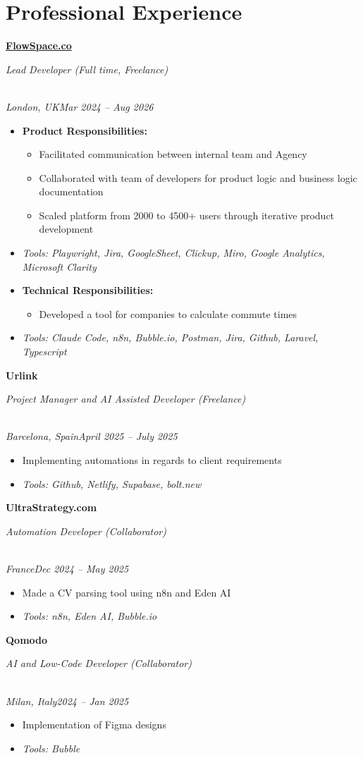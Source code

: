 \documentclass[a4paper,10pt]{article}
\newcommand{\role}[4]{\vspace{3pt}\noindent\hspace{0.6em}\parbox[t]{0.38\textwidth}{\raggedright\textbf{#1}}\hfill\parbox[t]{0.58\textwidth}{\raggedleft\textit{#2}}\\{\textit{#3}\hfill\textit{#4}}\vspace{1pt}}
\begin{document}
\section{Professional Experience}
\role{\href{https://flowspace.co}{FlowSpace.co}}{Lead Developer (Full time, Freelance)}{London, UK}{Mar 2024 -- Aug 2026}
\begin{itemize}
\item \textbf{Product Responsibilities:}
\begin{itemize}[label=--]
\item Facilitated communication between internal team and Agency
\item Collaborated with team of developers for product logic and business logic documentation
\item Scaled platform from 2000 to 4500+ users through iterative product development
\end{itemize}
\item \textit{Tools: Playwright, Jira, GoogleSheet, Clickup, Miro, Google Analytics, Microsoft Clarity}
\item \textbf{Technical Responsibilities:}
\begin{itemize}[label=--]
\item Developed a tool for companies to calculate commute times
\end{itemize}
\item \textit{Tools: Claude Code, n8n, Bubble.io, Postman, Jira, Github, Laravel, Typescript}
\end{itemize}

\role{Urlink}{Project Manager and AI Assisted Developer (Freelance)}{Barcelona, Spain}{April 2025 -- July 2025}
\begin{itemize}
\item Implementing automations in regards to client requirements
\item \textit{Tools: Github, Netlify, Supabase, bolt.new}
\end{itemize}

\role{UltraStrategy.com}{Automation Developer (Collaborator)}{France}{Dec 2024 -- May 2025}
\begin{itemize}
\item Made a CV parsing tool using n8n and Eden AI
\item \textit{Tools: n8n, Eden AI, Bubble.io}
\end{itemize}

\role{Qomodo}{AI and Low-Code Developer (Collaborator)}{Milan, Italy}{2024 -- Jan 2025}
\begin{itemize}
\item Implementation of Figma designs
\item \textit{Tools: Bubble}
\end{itemize}
\end{document}
